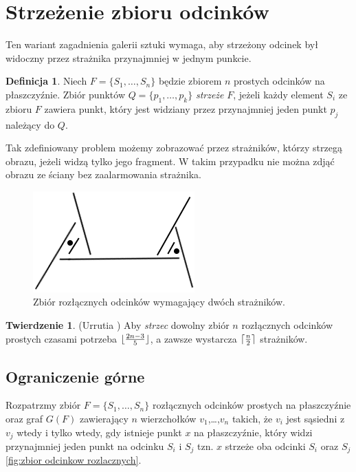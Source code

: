 \documentclass[brudnopis]{xmgr}
\DeclarePairedDelimiter\ceil{\lceil}{\rceil}
\DeclarePairedDelimiter\floor{\lfloor}{\rfloor}
\theoremstyle{definition}
\newtheorem{Twierdzenie}{Twierdzenie}
\newtheorem{Definicja}{Definicja}
\begin{document}
\section{Strzeżenie zbioru odcinków}
Ten wariant zagadnienia galerii sztuki wymaga, aby strzeżony odcinek był widoczny przez strażnika przynajmniej w jednym punkcie. 
\begin{Definicja}
Niech $F = \{S_1,\ldots,S_n\}$ będzie zbiorem $n$ prostych odcinków na płaszczyźnie. Zbiór punktów $Q = \{p_1,\ldots,p_k\}$ \emph{strzeże} $F$, jeżeli każdy element $S_i$ ze zbioru $F$ zawiera punkt, który jest widziany przez przynajmniej jeden punkt $p_j$ należący do $Q$.
\end{Definicja}
Tak zdefiniowany problem możemy zobrazować przez strażników, którzy strzegą obrazu, jeżeli widzą tylko jego fragment. W takim przypadku nie można zdjąć obrazu ze ściany bez zaalarmowania strażnika.
\begin{figure}[ht!]
 \centering
  \includegraphics{rysunki/rozlaczny_dwoch_straznikow.png}
  \caption{Zbiór rozłącznych odcinków wymagający dwóch strażników.}
\end{figure} 

\begin{Twierdzenie} \label{straznicy strzezenie} (Urrutia \cite{illumination})
Aby \emph{strzec} dowolny zbiór $n$ rozłącznych odcinków prostych czasami potrzeba $\floor{\frac{2n-3}{5}}$, a zawsze wystarcza $\ceil{\frac{n}{2}}$ strażników.
\end{Twierdzenie}

\subsection{Ograniczenie górne}
Rozpatrzmy zbiór $F =\{S_1,\ldots,S_n\}$ rozłącznych odcinków prostych na płaszczyźnie oraz graf $G(F)$ zawierający $n$ wierzchołków $v_1$,\ldots,$v_n$ takich, że $v_i$ jest sąsiedni z $v_j$ wtedy i tylko wtedy, gdy istnieje punkt $x$ na płaszczyźnie, który widzi przynajmniej jeden punkt na odcinku $S_i$ i $S_j$ tzn. $x$ strzeże oba odcinki $S_i$ oraz $S_j$ \ref{fig:zbior odcinkow rozlacznych}.
\end{document}
